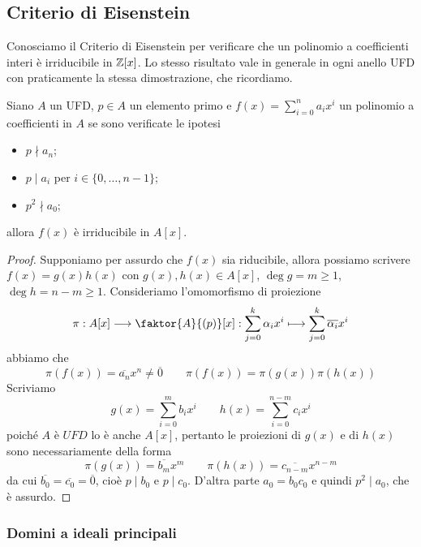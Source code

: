 \documentclass[11pt]{scrartcl}
\begin{document}
\newpage

\subsection{Criterio di Eisenstein}

Conosciamo il Criterio di Eisenstein per verificare che un polinomio a coefficienti
interi è irriducibile in $\mathbb Z[x]$. Lo stesso risultato vale in generale in 
ogni anello UFD con praticamente la stessa dimostrazione, che ricordiamo.

\begin{proposition}
    Siano $A$ un UFD, $p \in A$ un elemento primo e $f(x) = \displaystyle\sum_{i = 0}^n a_ix^i$
    un polinomio a coefficienti in $A$ se sono verificate le ipotesi
    \begin{itemize}
        \item $p \nmid a_n$;
        \item $p \mid a_i$ per $i \in \{0, \ldots, n - 1\}$;
        \item $p^2 \nmid a_0$;
    \end{itemize}
    allora $f(x)$ è irriducibile in $A[x]$.
\end{proposition}

\begin{proof}
    Supponiamo per assurdo che $f(x)$ sia riducibile, allora possiamo scrivere $f(x) = g(x)h(x)$
    con $g(x), h(x) \in A[x]$, $\deg g = m \geq 1$, $\deg h = n - m \geq 1$. 
    Consideriamo l'omomorfismo di proiezione
    \[
        \pi: A[x] \longrightarrow \faktor{A}{(p)}[x]: 
        \sum_{j = 0}^k\alpha_ix^i \longmapsto \sum_{j = 0}^k \overline{\alpha_i}x^i
    \]
    abbiamo che 
    \[
        \pi(f(x)) = \overline{a_n}x^n \neq \overline{0} \qquad\pi(f(x)) = \pi(g(x))\pi(h(x))
    \]
    Scriviamo 
    \[
        g(x) = \sum_{i = 0}^m b_ix^i\qquad h(x) = \sum_{i = 0}^{n - m}c_ix^i
    \]
    poiché $A$ è $UFD$ lo è anche $A[x]$, pertanto le proiezioni di $g(x)$
    e di $h(x)$ sono necessariamente della forma
    \[
        \pi(g(x)) = \overline{b_m}x^m\qquad \pi(h(x)) = \overline{c_{n - m}}x^{n - m}
    \]
    da cui $\overline{b_0} = \overline{c_0} = \overline{0}$, cioè $p \mid b_0$ e
    $p \mid c_0$. D'altra parte $a_0 = b_0c_0$ e quindi $p^2 \mid a_0$, che 
    è assurdo.
\end{proof}

\newpage

\subsubsection{Domini a ideali principali}
\end{document}
